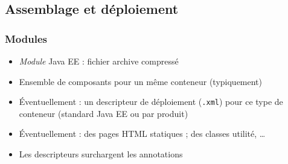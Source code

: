 \documentclass[english, french]{beamer}
\begin{document}
\subsection{Assemblage et déploiement}
\begin{frame}
	\frametitle{Modules}
	\begin{itemize}
		\item \emph{Module} Java EE : fichier archive compressé
		\item Ensemble de composants pour un même conteneur {\tiny (typiquement)}
		\item Éventuellement : un descripteur de déploiement (\texttt{.xml}) pour ce type de conteneur (standard Java EE ou par produit)
		\item Éventuellement :  des pages HTML statiques ; des classes utilité, …
		\item Les descripteurs surchargent les annotations
	\end{itemize}
\end{frame}
\end{document}
